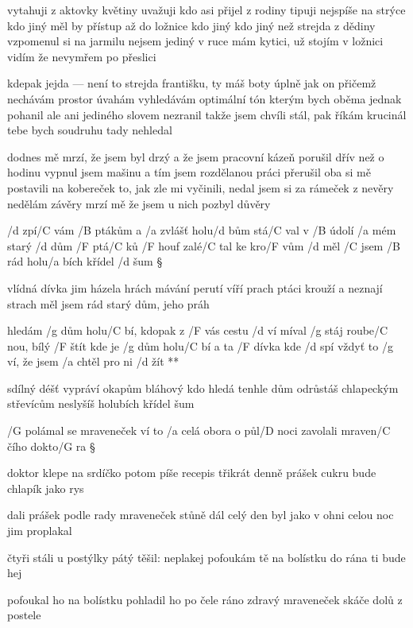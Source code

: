 vytahuji z aktovky květiny
uvažuji kdo asi přijel z rodiny
tipuji nejspíše na strýce
kdo jiný měl by přístup až do ložnice
kdo jiný kdo jiný než strejda z dědiny
vzpomenul si na jarmilu nejsem jediný
v ruce mám kytici, už stojím v ložnici
vidím že nevymřem po přeslici \s

kdepak jejda --- není to strejda
františku, ty máš boty úplně jak on
přičemž nechávám prostor úvahám
vyhledávám optimální tón
kterým bych oběma jednak pohanil
ale ani jediného slovem nezranil
takže jsem chvíli stál, pak říkám krucinál
tebe bych soudruhu tady nehledal \s

dodnes mě mrzí, že jsem byl drzý
a že jsem pracovní kázeň porušil
dřív než o hodinu vypnul jsem mašinu
a tím jsem rozdělanou práci přerušil
oba si mě postavili na kobereček
to, jak zle mi vyčinili, nedal jsem si za rámeček
z nevěry nedělám závěry
mrzí mě že jsem u nich pozbyl důvěry




/d zpí/C vám /B ptákům a /a zvlášť holu/d bům
stá/C val v /B údolí /a mém starý /d dům
/F ptá/C ků /F houf zalé/C tal ke kro/F vům
/d měl /C jsem /B rád holu/a bích křídel /d šum \S

vlídná dívka jim házela hrách
mávání perutí víří prach
ptáci krouží a neznají strach
měl jsem rád starý dům, jeho práh

\R  hledám /g dům holu/C bí, kdopak z /F vás cestu /d ví
    míval /g stáj roube/C nou, bílý /F štít
	kde je /g dům holu/C bí a ta /F dívka kde /d spí
	vždyť to /g ví, že jsem /a chtěl pro ni /d žít **

sdílný déšť vypráví okapům
bláhový kdo hledá tenhle dům
odrůstáš chlapeckým střevícům
neslyšíš holubích křídel šum




/G polámal se mraveneček
ví to /a celá obora
o půl/D noci zavolali
mraven/C čího dokto/G ra \S

doktor klepe na srdíčko
potom píše recepis
třikrát denně prášek cukru
bude chlapík jako rys \s

dali prášek podle rady
mraveneček stůně dál
celý den byl jako v ohni
celou noc jim proplakal \s

čtyři stáli u postýlky
pátý těšil: neplakej
pofoukám tě na bolístku
do rána ti bude hej \s

pofoukal ho na bolístku
pohladil ho po čele
ráno zdravý mraveneček
skáče dolů z postele



